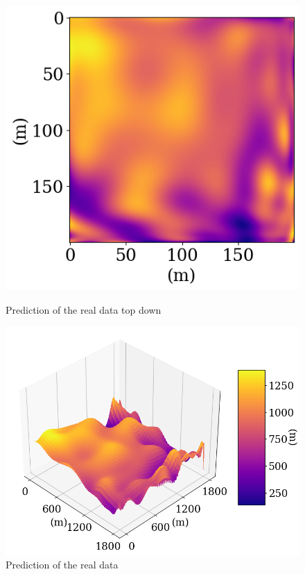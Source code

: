 \documentclass[twoside,11pt]{report}
\begin{document}
\begin{figure}[h]
    \begin{minipage}[t]{.48\linewidth}
        \begin{center}
            \includegraphics[width=1.0\textwidth]{../runsAndAdditions/realDataPredictMap.png}
    \caption{Prediction of the real data top down}\label{fig:realDataPredictMap}
    \end{center}
    \end{minipage}
    \hspace{4mm}
    \begin{minipage}[t]{.48\linewidth}
        \begin{center}
            \includegraphics[width=1.0\textwidth]{../runsAndAdditions/realDataPredict3D.png}
    \caption{Prediction of the real data}\label{fig:realDataPredict3d}
        \end{center}
    \end{minipage}
    \end{figure}
\end{document}

